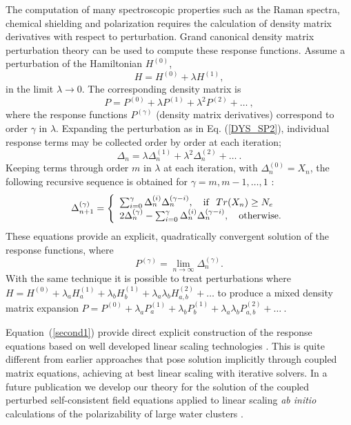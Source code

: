 The computation of many spectroscopic properties such as the Raman spectra, 
chemical shielding and polarization requires the calculation of density 
matrix derivatives with respect to perturbation.
Grand canonical density matrix perturbation 
theory can be used to compute these response functions.
Assume a perturbation of the Hamiltonian $H^{(0)}$,
\begin{equation}
{H} = H^{(0)} + \lambda H^{(1)},
\end{equation}
in the limit $\lambda \rightarrow 0$.  
The corresponding density matrix is
\begin{equation}
{P} = P^{(0)} + \lambda P^{(1)} + \lambda^2 P^{(2)} + \ldots~,
\end{equation}
where the response functions $P^{(\gamma)}$ (density matrix derivatives) correspond 
to order $\gamma$ in $\lambda$.  Expanding the perturbation as in 
Eq. (\ref{DYS_SP2}), individual response terms may be collected
order by order at each iteration;
\begin{equation}
\Delta_n = \lambda \Delta^{(1)}_n + \lambda^2 \Delta^{(2)}_n + \ldots~.
\end{equation}
Keeping terms through order $m$ in $\lambda$ at each iteration, 
with $\Delta^{(0)}_n = X_n$, the following recursive sequence is obtained 
for $\gamma = m,m-1,\ldots,1$ :
\begin{eqnarray}\label{second1}
\Delta^{(\gamma)}_{n+1} = \left\{ \begin{array}{l}
\sum_{i=0}^{\gamma} \Delta^{(i)}_n \Delta^{(\gamma-i)}_n, \quad {\rm if} ~~ {Tr}(X_n) \geq N_e\\ 
2\Delta^{(\gamma)}_n - \sum_{i=0}^{\gamma} \Delta^{(i)}_n \Delta^{(\gamma-i)}_n, \quad {\rm otherwise.}
\end{array} \right.
\end{eqnarray}
These equations provide an explicit, quadratically convergent solution of the response functions, 
where 
\begin{equation}
P^{(\gamma)} = \lim_{n \rightarrow \infty} \Delta^{(\gamma)}_n.  
\end{equation}
With the same technique it is possible to treat perturbations where 
${H} = H^{(0)} + \lambda_a H^{(1)}_a+\lambda_b H^{(1)}_b+ 
\lambda_a \lambda_b H^{(2)}_{a,b} + \ldots$
to produce a mixed density matrix expansion
${P} = P^{(0)} + \lambda_a P_a^{(1)} + \lambda_b P_b^{(1)} + 
\lambda_a \lambda_b P_{a,b}^{(2)} + \ldots~$.

Equation~(\ref{second1}) provide direct explicit construction of the response 
equations based on well developed linear scaling technologies \cite{NiklassonSP2,NiklassonSP4}.  
This is quite different from earlier approaches\cite{Frisch,Dupuis,Ochsenfeld,Larsen}  
that pose solution implicitly through coupled matrix 
equations, achieving at best linear scaling with iterative solvers.
In a future publication we develop our theory for the solution
of the coupled perturbed self-consistent field equations applied to
linear scaling {\it ab initio} calculations of the polarizability of 
large water clusters \cite{Weber04}. 

